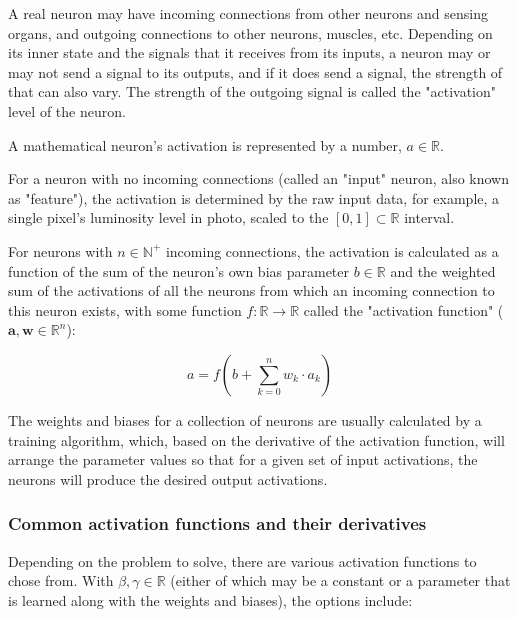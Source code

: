 \documentclass[titlepage]{article}
\begin{document}
      A real neuron may have incoming connections from other neurons and
      sensing organs, and outgoing connections to other neurons, muscles, etc.
      Depending on its inner state and the signals that it receives from its
      inputs, a neuron may or may not send a signal to its outputs, and if it
      does send a signal, the strength of that can also vary. The strength of
      the outgoing signal is called the "activation" level of the neuron.

      A mathematical neuron's activation is represented by a number,
      $a \in \mathbb{R}$.

      For a neuron with no incoming connections (called an "input" neuron, also
      known as "feature"), the activation is determined by the raw input data,
      for example, a single pixel's luminosity level in photo, scaled to the
      $[0, 1] \subset \mathbb{R}$ interval.

      For neurons with $n \in \mathbb{N}^+$ incoming connections, the
      activation is calculated as a function of the sum of the neuron's own
      bias parameter $b \in \mathbb{R}$ and the weighted sum of the activations
      of all the neurons from which an incoming connection to this neuron
      exists, with some function $f : \mathbb{R} \rightarrow \mathbb{R}$ called
      the "activation function" ($\mathbf{a}, \mathbf{w} \in \mathbb{R}^n$):

      \begin{equation}
        a = f \left( b + \sum_{k=0}^n w_k \cdot a_k \right)
      \end{equation}

      The weights and biases for a collection of neurons are usually calculated
      by a training algorithm, which, based on the derivative of the activation
      function, will arrange the parameter values so that for a given set of
      input activations, the neurons will produce the desired output
      activations.

      \subsubsection{Common activation functions and their derivatives}

        Depending on the problem to solve, there are various activation
        functions to chose from. With $\beta, \gamma \in \mathbb{R}$ (either of
        which may be a constant or a parameter that is learned along with the
        weights and biases), the options include:
\end{document}
